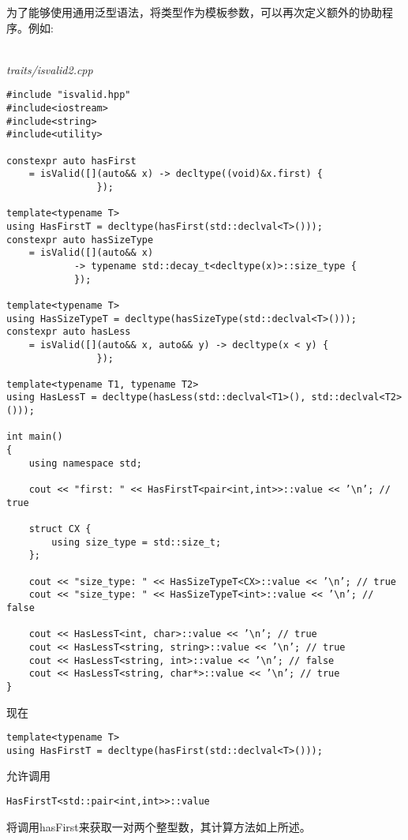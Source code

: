 为了能够使用通用泛型语法，将类型作为模板参数，可以再次定义额外的协助程序。例如:

\hspace*{\fill} \\ %
\noindent
\textit{traits/isvalid2.cpp}
\begin{lstlisting}[style=styleCXX]
#include "isvalid.hpp"
#include<iostream>
#include<string>
#include<utility>

constexpr auto hasFirst
	= isValid([](auto&& x) -> decltype((void)&x.first) {
				});
			
template<typename T>
using HasFirstT = decltype(hasFirst(std::declval<T>()));
constexpr auto hasSizeType
	= isValid([](auto&& x)
			-> typename std::decay_t<decltype(x)>::size_type {
			});

template<typename T>
using HasSizeTypeT = decltype(hasSizeType(std::declval<T>()));
constexpr auto hasLess
	= isValid([](auto&& x, auto&& y) -> decltype(x < y) {
				});

template<typename T1, typename T2>
using HasLessT = decltype(hasLess(std::declval<T1>(), std::declval<T2>()));

int main()
{
	using namespace std;
	
	cout << "first: " << HasFirstT<pair<int,int>>::value << ’\n’; // true
	
	struct CX {
		using size_type = std::size_t;
	};

	cout << "size_type: " << HasSizeTypeT<CX>::value << ’\n’; // true
	cout << "size_type: " << HasSizeTypeT<int>::value << ’\n’; // false
	
	cout << HasLessT<int, char>::value << ’\n’; // true
	cout << HasLessT<string, string>::value << ’\n’; // true
	cout << HasLessT<string, int>::value << ’\n’; // false
	cout << HasLessT<string, char*>::value << ’\n’; // true
}
\end{lstlisting}

现在

\begin{lstlisting}[style=styleCXX]
template<typename T>
using HasFirstT = decltype(hasFirst(std::declval<T>()));
\end{lstlisting}

允许调用

\begin{lstlisting}[style=styleCXX]
HasFirstT<std::pair<int,int>>::value
\end{lstlisting}

将调用hasFirst来获取一对两个整型数，其计算方法如上所述。










